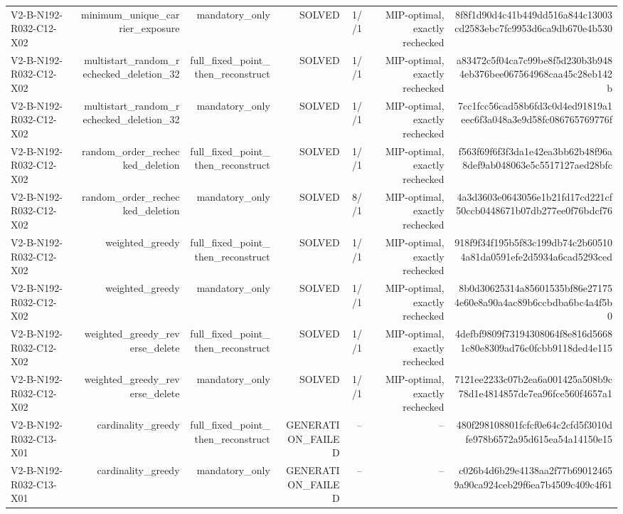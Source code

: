 {\begin{longtable}{lrrrrrr}
V2-B-N192-R032-C12-X02 & minimum\_unique\_carrier\_exposure & mandatory\_only & SOLVED & 1//1 & MIP-optimal, exactly rechecked & 8f8f1d90d4c41b449dd516a844c13003cd2583ebc7fc9953d6ca9db670e4b530 \\
V2-B-N192-R032-C12-X02 & multistart\_random\_rechecked\_deletion\_32 & full\_fixed\_point\_then\_reconstruct & SOLVED & 1//1 & MIP-optimal, exactly rechecked & a83472c5f04ca7c99be8f5d230b3b9484eb376bee067564968caa45c28eb142b \\
V2-B-N192-R032-C12-X02 & multistart\_random\_rechecked\_deletion\_32 & mandatory\_only & SOLVED & 1//1 & MIP-optimal, exactly rechecked & 7cc1fcc56cad58b6fd3c0d4ed91819a1eec6f3a048a3e9d58fc086765769776f \\
V2-B-N192-R032-C12-X02 & random\_order\_rechecked\_deletion & full\_fixed\_point\_then\_reconstruct & SOLVED & 1//1 & MIP-optimal, exactly rechecked & f563f69f6f3f3da1e42ea3bb62b48f96a8def9ab048063e5c5517127aed28bfc \\
V2-B-N192-R032-C12-X02 & random\_order\_rechecked\_deletion & mandatory\_only & SOLVED & 8//1 & MIP-optimal, exactly rechecked & 4a3d3603e0643056e1b21fd17cd221cf50ccb0448671b07db277ee0f76bdcf76 \\
V2-B-N192-R032-C12-X02 & weighted\_greedy & full\_fixed\_point\_then\_reconstruct & SOLVED & 1//1 & MIP-optimal, exactly rechecked & 918f9f34f195b5f83c199db74c2b605104a81da0591efe2d5934a6cad5293ced \\
V2-B-N192-R032-C12-X02 & weighted\_greedy & mandatory\_only & SOLVED & 1//1 & MIP-optimal, exactly rechecked & 8b0d30625314a85601535bf86e271754e60e8a90a4ac89b6ccbdba6bc4a4f5b0 \\
V2-B-N192-R032-C12-X02 & weighted\_greedy\_reverse\_delete & full\_fixed\_point\_then\_reconstruct & SOLVED & 1//1 & MIP-optimal, exactly rechecked & 4defbf9809f73194308064f8e816d56681c80e8309ad76c0fcbb9118ded4e115 \\
V2-B-N192-R032-C12-X02 & weighted\_greedy\_reverse\_delete & mandatory\_only & SOLVED & 1//1 & MIP-optimal, exactly rechecked & 7121ee2233c07b2ea6a001425a508b9c78d1e4814857de7ea96fce560f4657a1 \\
V2-B-N192-R032-C13-X01 & cardinality\_greedy & full\_fixed\_point\_then\_reconstruct & GENERATION\_FAILED & -- & -- & 480f298108801fcfcf0e64c2cfd5f3010dfe978b6572a95d615ea54a14150e15 \\
V2-B-N192-R032-C13-X01 & cardinality\_greedy & mandatory\_only & GENERATION\_FAILED & -- & -- & c026b4d6b29e4138aa2f77b690124659a90ca924ceb29f6ea7b4509c409c4f61 \\

\end{longtable}}
